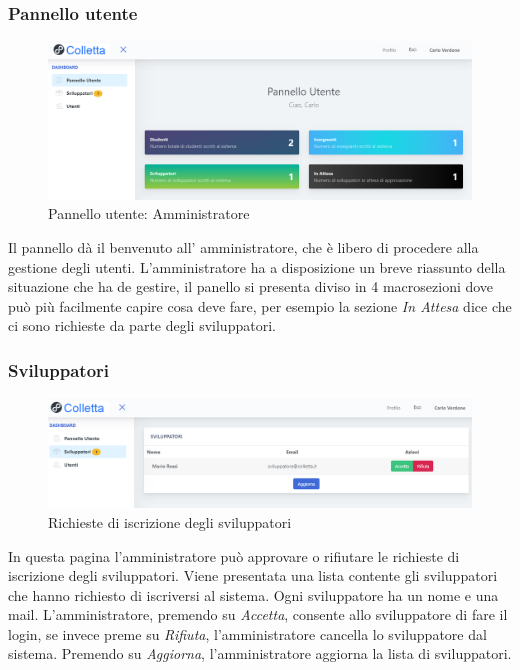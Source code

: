 		\subsubsection{Pannello utente}
			\begin{figure}[H]
				\centering
				\includegraphics[width=17cm]{sez/img/amministratore/panelloadmin.PNG}
				\caption{Pannello utente: Amministratore}\label{fig:1}
			\end{figure}
		
		 Il pannello dà il benvenuto all' amministratore, che è libero di procedere alla gestione degli utenti.
		 L'amministratore ha a disposizione un breve riassunto della situazione che ha de gestire, il panello si presenta diviso in 4 macrosezioni dove può più facilmente capire cosa deve fare, per esempio la sezione \textit{In Attesa} dice che ci sono richieste da parte degli sviluppatori.




		\subsubsection{Sviluppatori}
			\begin{figure}[H]
				\centering
				\includegraphics[width=17cm]{sez/img/amministratore/conf_ric_svil.PNG}
				\caption{Richieste di iscrizione degli sviluppatori}\label{fig:1}
			\end{figure}
		  In questa pagina l'amministratore può approvare o rifiutare le richieste di iscrizione degli sviluppatori. Viene presentata una lista contente gli sviluppatori che hanno richiesto di iscriversi al sistema. Ogni sviluppatore ha un nome e una mail. L'amministratore, premendo su \textit{Accetta}, consente allo sviluppatore di fare il login, se invece preme su \textit{Rifiuta}, l'amministratore cancella lo sviluppatore dal sistema. Premendo su \textit{Aggiorna}, l'amministratore aggiorna la lista di sviluppatori.


